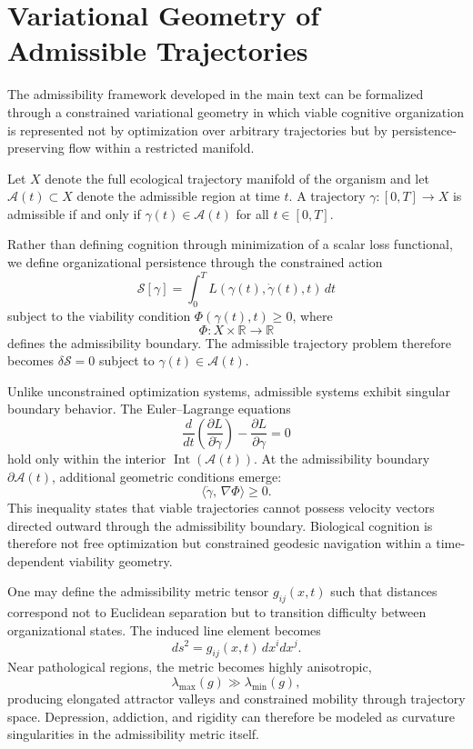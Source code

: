\documentclass[12pt,a4paper]{report}
\theoremstyle{flyxion}
\begin{document}
\appendix

\chapter{Variational Geometry of Admissible Trajectories}

The admissibility framework developed in the main text can be formalized through a constrained variational geometry in which viable cognitive organization is represented not by optimization over arbitrary trajectories but by persistence-preserving flow within a restricted manifold.

Let $X$ denote the full ecological trajectory manifold of the organism and let $\mathcal{A}(t) \subset X$ denote the admissible region at time $t$. A trajectory $\gamma : [0,T] \rightarrow X$ is admissible if and only if $\gamma(t) \in \mathcal{A}(t)$ for all $t \in [0,T]$.

Rather than defining cognition through minimization of a scalar loss functional, we define organizational persistence through the constrained action
\[
\mathcal{S}[\gamma] = \int_0^T L(\gamma(t),\dot{\gamma}(t),t)\,dt
\]
subject to the viability condition $\Phi(\gamma(t),t) \geq 0$, where
\[
\Phi : X \times \mathbb{R} \rightarrow \mathbb{R}
\]
defines the admissibility boundary. The admissible trajectory problem therefore becomes $\delta\mathcal{S} = 0$ subject to $\gamma(t) \in \mathcal{A}(t)$.

Unlike unconstrained optimization systems, admissible systems exhibit singular boundary behavior. The Euler--Lagrange equations
\[
\frac{d}{dt}\!\left(\frac{\partial L}{\partial \dot{\gamma}}\right) - \frac{\partial L}{\partial \gamma} = 0
\]
hold only within the interior $\operatorname{Int}(\mathcal{A}(t))$. At the admissibility boundary $\partial\mathcal{A}(t)$, additional geometric conditions emerge:
\[
\langle \dot{\gamma},\, \nabla\Phi \rangle \geq 0.
\]
This inequality states that viable trajectories cannot possess velocity vectors directed outward through the admissibility boundary. Biological cognition is therefore not free optimization but constrained geodesic navigation within a time-dependent viability geometry.

One may define the admissibility metric tensor $g_{ij}(x,t)$ such that distances correspond not to Euclidean separation but to transition difficulty between organizational states. The induced line element becomes
\[
ds^2 = g_{ij}(x,t)\,dx^i dx^j.
\]
Near pathological regions, the metric becomes highly anisotropic,
\[
\lambda_{\max}(g) \gg \lambda_{\min}(g),
\]
producing elongated attractor valleys and constrained mobility through trajectory space. Depression, addiction, and rigidity can therefore be modeled as curvature singularities in the admissibility metric itself.
\end{document}
